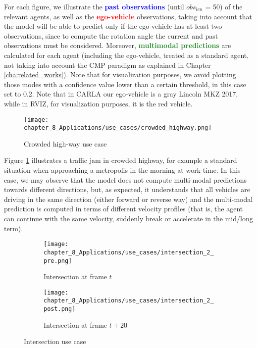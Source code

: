 For each figure, we illustrate the \textbf{\textcolor{blue}{past observations}} (until \textit{$obs_{len}$} = 50) of the relevant agents, as well as the \textbf{\textcolor{red}{ego-vehicle}} observations, taking into account that the model will be able to predict only if the ego-vehicle has at least two observations, since to compute the rotation angle the current and past observations must be considered. Moreover, \textbf{\textcolor{ForestGreen}{multimodal predictions}} are calculated for each agent (including the ego-vehicle, treated as a standard agent, not taking into account the \ac{CMP} paradigm as explained in Chapter \ref{cha:related_works}). Note that for visualization purposes, we avoid plotting those modes with a confidence value lower than a certain threshold, in this case set to 0.2. Note that in \ac{CARLA} our ego-vehicle is a gray Lincoln MKZ 2017, while in \ac{RVIZ}, for visualization purposes, it is the red vehicle.

\begin{figure}[!h]
	\centering
	\texttt{[image: chapter\_8\_Applications/use\_cases/crowded\_highway.png]}
	\caption{Crowded high-way use case}
	\label{fig:chapter_8_Applications/use_cases/crowded_highway}
\end{figure}

Figure \ref{fig:chapter_8_Applications/use_cases/crowded_highway} illustrates a traffic jam in crowded highway, for example a standard situation when approaching a metropolis in the morning at work time. In this case, we may observe that the model does not compute multi-modal predictions towards different directions, but, as expected, it understands that all vehicles are driving in the same direction (either forward or reverse way) and the multi-modal prediction is computed in terms of different velocity profiles (that is, the agent can continue with the same velocity, suddenly break or accelerate in the mid/long term).

\begin{figure}[!h]
	\begin{subfigure}{\textwidth}
		\texttt{[image: chapter\_8\_Applications/use\_cases/intersection\_2\_pre.png]}
		\label{subfig:chapter_8_Applications/use_cases/intersection_2_pre}
		\caption{Intersection at frame $t$}
	\end{subfigure}
	\begin{subfigure}{\textwidth}
		\texttt{[image: chapter\_8\_Applications/use\_cases/intersection\_2\_post.png]}
		\label{subfig:chapter_8_Applications/use_cases/intersection_2_post}
		\caption{Intersection at frame $t+20$}
	\end{subfigure}
	
	\caption{Intersection use case}
	\label{fig:chapter_8_Applications/use_cases/intersection}
\end{figure}

